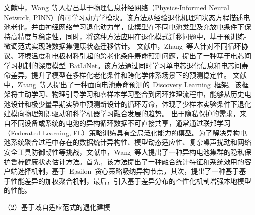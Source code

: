 文献\cite{wang2024physics}中，Wang~等人提出基于物理信息神经网络（Physics-Informed Neural Network, PINN）的可学习动力学模块。该方法从经验退化机理和状态方程描述电池老化，并由神经网络学习退化动力学，使模型在不同电池类型及充放电条件下保持高精度与稳定性，同时，将这种方法应用在退化模式迁移问题中，基于预训练-微调范式实现跨数据集健康状态迁移估计。
文献\cite{zhang2025batlinet}中，Zhang~等人针对不同循环协议、环境温度和电极材料引起的跨老化条件寿命预测问题，提出了一种基于电芯间学习机制的深度模型~BatLiNet。该方法通过同时学习单电芯退化信息和电芯间寿命差异，提升了模型在多样化老化条件和跨化学体系场景下的预测稳定性。
文献\cite{zhang2026discovery_learning}中，Zhang~等人提出了一种面向电池寿命预测的~Discovery Learning~框架。该框架将主动学习、物理引导学习和零样本学习整合到闭环推理流程中，能够从历史电池设计和极少量早期实验中预测新设计的循环寿命，体现了少样本实验条件下退化建模向物理知识驱动和科学机器学习融合发展的趋势。
出于隐私保护的需求，来自不同设备或系统的电池的异构循环数据不可直接共享，通常通过联邦学习（Federated Learning, FL）策略训练具有全局泛化能力的模型。为了解决异构电池系统聚合过程中存在的数据统计异构性、模型动态适应性、复杂噪声扰动和网络安全工具防御韧性等挑战，文献\cite{10886998}中，Wang~等人提出了一种异构电池集群的隐私保护鲁棒健康状态估计方法。首先，该方法提出了一种融合统计特征和系统效用的客户端选择机制，基于~Epsilon~贪心策略吸纳异构节点，其次，提出了一种基于基于性能差异的加权聚合机制，最后，引入基于差异分布的个性化机制增强本地模型的性能。

（2）{基于域自适应范式的退化建模}


